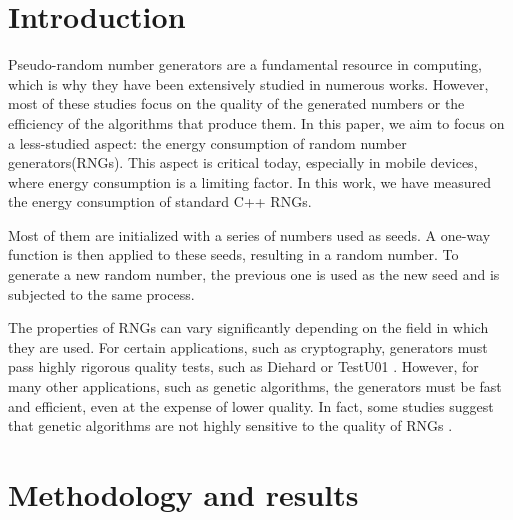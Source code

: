 \documentclass[dvipsnames,format=sigconf,anonymous=true,review=true]{acmart}
\begin{document}


\maketitle

\section{Introduction}
\label{sec:introduction}

Pseudo-random number generators \cite{marsaglia2003random} are a fundamental resource in computing, which is why they have been extensively studied in numerous works. However, most of these studies focus on the quality of the generated numbers or the efficiency of the algorithms that produce them. In this paper, we aim to focus on a less-studied aspect: the energy consumption of random number generators(RNGs). This aspect is critical today, especially in mobile devices, where energy consumption is a limiting factor. In this work, we have measured the energy consumption of standard C++ RNGs.

Most of them are initialized with a series of numbers used as seeds. A one-way function is then applied to these seeds, resulting in a random number. To generate a new random number, the previous one is used as the new seed and is subjected to the same process.

The properties of RNGs can vary significantly depending on the field in which they are used. For certain applications, such as cryptography, generators must pass highly rigorous quality tests, such as Diehard \cite{marsaglia1997diehard} or TestU01 \cite{testu01}. However, for many other applications, such as genetic algorithms, the generators must be fast and efficient, even at the expense of lower quality. In fact, some studies suggest that genetic algorithms are not highly sensitive to the quality of RNGs \cite{cardenas2011sensitiveness}.

\section{Methodology and results}
\label{sec:methodology}
\end{document}
